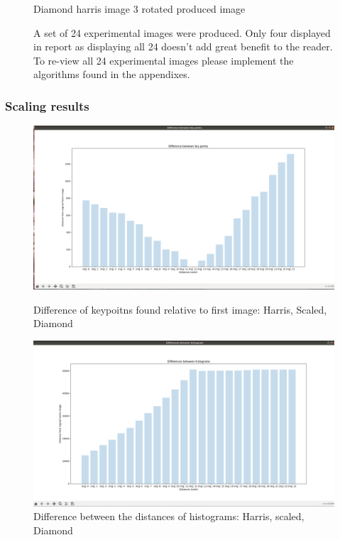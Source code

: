 \documentclass[conference]{IEEEtran}
\begin{document}
\begin{figure}[!htb]
\begin{minipage}[b]{0.2\textwidth}
    \caption{Diamond harris image 3 rotated produced image}
    \label{Diamond harris image 3 rotated produced image}
  \end{minipage}
  {\caption*{A set of 24 experimental images were produced. Only four displayed in report as displaying all 24 doesn't add great benefit to the reader. To re-view all 24 experimental images please implement the algorithms found in the appendixes.}}
\end{figure}

\subsubsection{Scaling results}
\begin{figure}[!htb]
  \centering
  \begin{minipage}[t]{0.45\textwidth}
    \includegraphics[width=\textwidth]{../programme/results/Task_1/scaled_experiements/Harris/diamond/experiment_one_diff_kp.png}
    \caption{Difference of keypoitns found relative to first image: Harris, Scaled, Diamond}
    \label{Difference of keypoints found relative to first image: Harris, Scaled, Diamond}
  \end{minipage}
  \hfill
  \begin{minipage}[t]{0.45\textwidth}
    \includegraphics[width=\textwidth]{../programme/results/Task_1/scaled_experiements/Harris/diamond/exp_three_diff_between_hists.png}
    \caption{Difference between the distances of histograms: Harris, scaled, Diamond}
    \label{Difference between the distances of histograms: Harris, scaled, Diamond}
  \end{minipage}
\end{figure}
\end{document}
